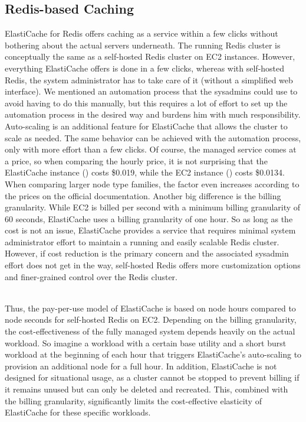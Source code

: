 \subsection{Redis-based Caching}
ElastiCache for Redis offers caching as a service within a few clicks without bothering about the actual servers underneath. The running Redis cluster is conceptually the same as a self-hosted Redis cluster on EC2 instances. However, everything ElastiCache offers is done in a few clicks, whereas with self-hosted Redis, the system administrator has to take care of it (without a simplified web interface). We mentioned an automation process that the sysadmins could use to avoid having to do this manually, but this requires a lot of effort to set up the automation process in the desired way and burdens him with much responsibility. Auto-scaling is an additional feature for ElastiCache that allows the cluster to scale as needed. The same behavior can be achieved with the automation process, only with more effort than a few clicks. Of course, the managed service comes at a price, so when comparing the hourly price, it is not surprising that the ElastiCache instance () costs \$0.019, while the EC2 instance () costs \$0.0134. When comparing larger node type families, the factor even increases according to the prices on the official documentation. Another big difference is the billing granularity. While EC2 is billed per second with a minimum billing granularity of 60 seconds, ElastiCache uses a billing granularity of one hour. So as long as the cost is not an issue, ElastiCache provides a service that requires minimal system administrator effort to maintain a running and easily scalable Redis cluster. However, if cost reduction is the primary concern and the associated sysadmin effort does not get in the way, self-hosted Redis offers more customization options and finer-grained control over the Redis cluster. 

~\\
Thus, the pay-per-use model of ElastiCache is based on node hours compared to node seconds for self-hosted Redis on EC2. Depending on the billing granularity, the cost-effectiveness of the fully managed system depends heavily on the actual workload. So imagine a workload with a certain base utility and a short burst workload at the beginning of each hour that triggers ElastiCache's auto-scaling to provision an additional node for a full hour. In addition, ElastiCache is not designed for situational usage, as a cluster cannot be stopped to prevent billing if it remains unused but can only be deleted and recreated. This, combined with the billing granularity, significantly limits the cost-effective elasticity of ElastiCache for these specific workloads. 

